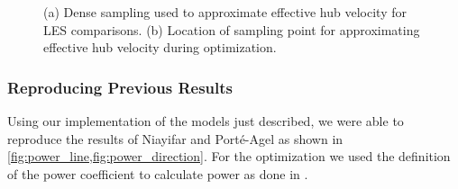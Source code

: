 \documentclass[conf]{new-aiaa}
\begin{document}
{\begin{figure}[ht]
	\centering
	\caption{(a) Dense sampling used to approximate effective hub velocity for LES comparisons. (b) Location of sampling point for approximating effective hub velocity during optimization.}
	\label{fig:sampling_locs}
\end{figure}

\subsubsection{Reproducing Previous Results}
Using our implementation of the models just described, we were able to reproduce the results of Niayifar and Port\'{e}-Agel \cite{niayifar2016} as shown in \cref{fig:power_line,fig:power_direction}. For the optimization we used the definition of the power coefficient to calculate power as done in \cite{gebraad2014}.  

}
\end{document}
